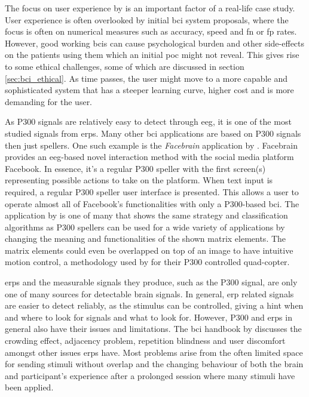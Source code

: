 The focus on user experience by \citet{p300_speller_real_life2} is an important factor of a real-life case study.
User experience is often overlooked by initial \gls{bci} system proposals, where the focus is often on numerical measures such as accuracy, speed and \gls{fn} or \gls{fp} rates.
However, good working \glspl{bci} can cause psychological burden and other side-effects on the patients using them which an initial \gls{poc} might not reveal.
This gives rise to some ethical challenges, some of which are discussed in section \ref{sec:bci_ethical}.
As time passes, the user might move to a more capable and sophisticated system that has a steeper learning curve, higher cost and is more demanding for the user.

As P300 signals are relatively easy to detect through \gls{eeg}, it is one of the most studied signals from \glspl{erp}.
Many other \gls{bci} applications are based on P300 signals then just spellers.
One such example is the \textit{Facebrain} application by \citet{facebrain}.
Facebrain provides an \gls{eeg}-based novel interaction method with the social media platform Facebook.
In essence, it's a regular P300 speller with the first screen(s) representing possible actions to take on the platform.
When text input is required, a regular P300 speller user interface is presented.
This allows a user to operate almost all of Facebook's functionalities with only a P300-based \gls{bci}.
The application by \citet{facebrain} is one of many that shows the same strategy and classification algorithms as P300 spellers can be used for a wide variety of applications by changing the meaning and functionalities of the shown matrix elements.
The matrix elements could even be overlapped on top of an image to have intuitive motion control, a methodology used by \citet{p300_drone} for their P300 controlled quad-copter.

\glspl{erp} and the measurable signals they produce, such as the P300 signal, are only one of many sources for detectable brain signals.
In general, \gls{erp} related signals are easier to detect reliably, as the stimulus can be controlled, giving a hint when and where to look for signals and what to look for.
However, P300 and \glspl{erp} in general also have their issues and limitations.
The \gls{bci} handbook by \citet[Chapter~26]{bci_handbook} discusses the crowding effect, adjacency problem, repetition blindness and user discomfort amongst other issues \glspl{erp} have.
Most problems arise from the often limited space for sending stimuli without overlap and the changing behaviour of both the brain and participant's experience after a prolonged session where many stimuli have been applied.


